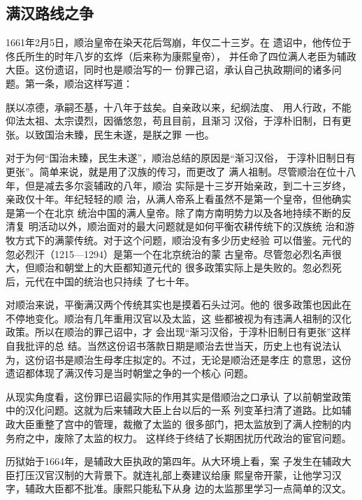 \subsection{满汉路线之争}
\par
1661年2月5日，顺治皇帝在染天花后驾崩，年仅二十三岁。在%
遗诏中，他传位于佟氏所生的时年八岁的玄烨（后来称为康熙皇帝），%
并任命了四位满人老臣为辅政大臣。这份遗诏，同时也是顺治写的一%
份罪己诏，承认自己执政期间的诸多问题。第一条，顺治这样写道：%
\par
{\bookkai 朕以凉德，承嗣丕基，十八年于兹矣。自亲政以来，纪纲法度、}%
{\bookkai 用人行政，不能仰法太祖、太宗谟烈，因循悠忽，苟且目前，且渐习}%
{\bookkai 汉俗，于淳朴旧制，日有更张。以致国治未臻，民生未遂，是朕之罪}%
{\bookkai 一也。}%
\par
对于为何“国治未臻，民生未遂”，顺治总结的原因是“渐习汉俗，%
于淳朴旧制日有更张”。简单来说，就是用了汉族的传习，而更改了%
满人祖制。尽管顺治在位十八年，但是减去多尔衮辅政的八年，顺治%
实际是十三岁开始亲政，到二十三岁终，亲政仅十年。年纪轻轻的顺%
治，从满人帝系上看虽然不是第一个皇帝，但他确实是第一个在北京%
统治中国的满人皇帝。除了南方南明势力以及各地持续不断的反清复%
明活动以外，顺治面对的最大问题就是如何平衡农耕传统下的汉族统%
治和游牧方式下的满蒙传统。对于这个问题，顺治没有多少历史经验%
可以借鉴。元代的忽必烈汗（1215—1294）是第一个在北京统治的蒙%
古皇帝。尽管忽必烈名声很大，但顺治和朝堂上的大臣都知道元代的%
很多政策实际上是失败的。忽必烈死后，元代在中国的统治也只持续%
了七十年。%
\par
对顺治来说，平衡满汉两个传统其实也是摸着石头过河。他的%
很多政策也因此在不停地变化。顺治有几年重用汉官以及太监，这%
些都被视为有违满人祖制的汉化政策。所以在顺治的罪己诏中，才%
会出现“渐习汉俗，于淳朴旧制日有更张”这样自我批评的总%
结。当然这份诏书落款日期是顺治去世当天，历史上也有说法认%
为，这份诏书是顺治生母孝庄拟定的。不过，无论是顺治还是孝庄%
的意思，这份遗诏都体现了满汉传习是当时朝堂之争的一个核心%
问题。%
\par
从现实角度看，这份罪已诏最实际的作用其实是借顺治之口承认%
了以前朝堂政策中的汉化问题。这就为后来辅政大臣上台以后的一系%
列变革扫清了道路。比如辅政大臣重整了宫中的管理，裁撤了太监的%
很多部门，把太监放到了满人控制的内务府之中，废除了太监的权力。%
这样终于终结了长期困扰历代政治的宦官问题。%
\par
历狱始于1664年，是辅政大臣执政的第四年。从大环境上看，案%
子发生在辅政大臣打压汉官汉制的大背景下。就连礼部上奏建议给康%
熙皇帝开蒙，让他学习汉字，辅政大臣都不批准。康熙只能私下从身%
边的太监那里学习一点简单的汉文。%
